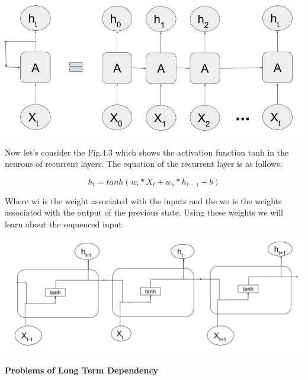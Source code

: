 				\begin{center}
				\includegraphics[width=\linewidth]{figures/An-unrolled-recurrent-neural-network.jpg}	
				\label{fig: Unfolded Recurrent layer}
				\end{center}


Now let’s consider the Fig.4.3 which shows the activation function tanh in the neurons of recurrent layers. The equation of the recurrent layer is as follows:

\begin{equation}
	h_{t} = tanh (w_{i} * X_{t} + w_{o} * h_{t-1} + b)
\end{equation}


Where wi is the weight associated with the inputs and the wo is the weights associated with the output of the previous state. Using these weights we will learn about the sequenced input.

				\begin{center}
				\includegraphics[width=\linewidth]{figures/The-repeating-module-in-a-standard-RNN.jpg}	
				\label{fig: Unfolded Recurrent layer with activation function}
				\end{center}


\paragraph{Problems of Long Term Dependency}

